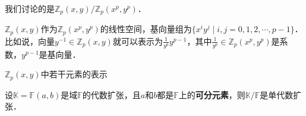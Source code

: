 我们讨论的是$\mathbb{Z}_p(x, y)/\mathbb{Z}_p(x^p, y^p)$．

$\mathbb{Z}_p(x, y)$作为$\mathbb{Z}_p(x^p, y^p)$的线性空间，基向量组为$\{x^iy^j\mid i, j=0, 1, 2, \cdots, p-1\}$．比如说，向量$y^{-1}\in\mathbb{Z}_p(x, y)$就可以表示为$\frac{1}{y^p}y^{p-1}$，其中$\frac{1}{y^p}\in\mathbb{Z}_p(x^p, y^p)$是系数，$y^{p-1}$是基向量．

\begin{example}{$\mathbb{Z}_p(x, y)$中若干元素的表示}

\end{example}





\begin{corollary}{}
设$\mathbb{K}=\mathbb{F}(a, b)$是域$\mathbb{F}$的代数扩张，且$a$和$b$都是$\mathbb{F}$上的\textbf{可分元素}，则$\mathbb{K}/\mathbb{F}$是单代数扩张．
\end{corollary}





























